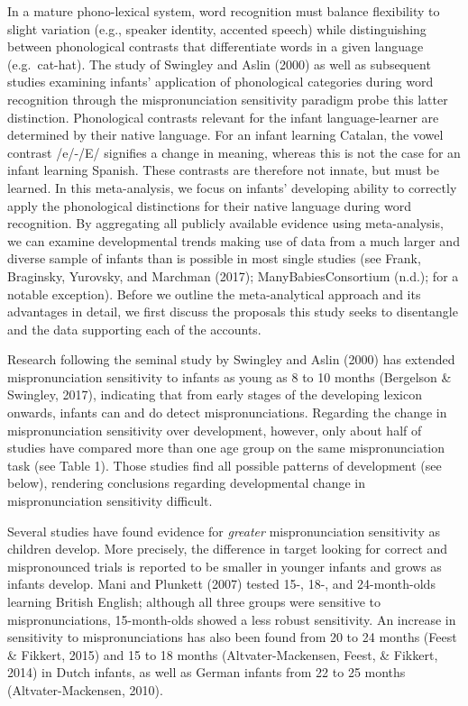 \documentclass[man]{apa6}
\begin{document}
In a mature phono-lexical system, word recognition must balance flexibility to slight variation (e.g., speaker identity, accented speech) while distinguishing between phonological contrasts that differentiate words in a given language (e.g.~cat-hat). The study of Swingley and Aslin (2000) as well as subsequent studies examining infants' application of phonological categories during word recognition through the mispronunciation sensitivity paradigm probe this latter distinction. Phonological contrasts relevant for the infant language-learner are determined by their native language. For an infant learning Catalan, the vowel contrast /e/-/E/ signifies a change in meaning, whereas this is not the case for an infant learning Spanish. These contrasts are therefore not innate, but must be learned. In this meta-analysis, we focus on infants' developing ability to correctly apply the phonological distinctions for their native language during word recognition. By aggregating all publicly available evidence using meta-analysis, we can examine developmental trends making use of data from a much larger and diverse sample of infants than is possible in most single studies (see Frank, Braginsky, Yurovsky, and Marchman (2017); ManyBabiesConsortium (n.d.); for a notable exception). Before we outline the meta-analytical approach and its advantages in detail, we first discuss the proposals this study seeks to disentangle and the data supporting each of the accounts.

Research following the seminal study by Swingley and Aslin (2000) has extended mispronunciation sensitivity to infants as young as 8 to 10 months (Bergelson \& Swingley, 2017), indicating that from early stages of the developing lexicon onwards, infants can and do detect mispronunciations. Regarding the change in mispronunciation sensitivity over development, however, only about half of studies have compared more than one age group on the same mispronunciation task (see Table 1). Those studies find all possible patterns of development (see below), rendering conclusions regarding developmental change in mispronunciation sensitivity difficult.

Several studies have found evidence for \emph{greater} mispronunciation sensitivity as children develop. More precisely, the difference in target looking for correct and mispronounced trials is reported to be smaller in younger infants and grows as infants develop. Mani and Plunkett (2007) tested 15-, 18-, and 24-month-olds learning British English; although all three groups were sensitive to mispronunciations, 15-month-olds showed a less robust sensitivity. An increase in sensitivity to mispronunciations has also been found from 20 to 24 months (Feest \& Fikkert, 2015) and 15 to 18 months (Altvater-Mackensen, Feest, \& Fikkert, 2014) in Dutch infants, as well as German infants from 22 to 25 months (Altvater-Mackensen, 2010).
\end{document}
